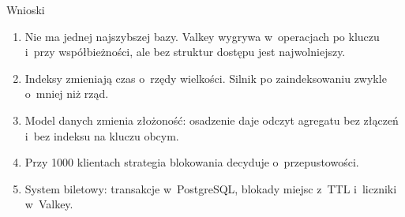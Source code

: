 \documentclass[aspectratio=169,11pt]{beamer}
\begin{document}
\begin{frame}{Wnioski}
  \begin{enumerate}\small
    \item Nie ma jednej najszybszej bazy. Valkey wygrywa w~operacjach po kluczu
      i~przy współbieżności, ale bez struktur dostępu jest najwolniejszy.
    \item Indeksy zmieniają czas o~rzędy wielkości. Silnik po zaindeksowaniu
      zwykle o~mniej niż rząd.
    \item Model danych zmienia złożoność: osadzenie daje odczyt agregatu bez
      złączeń i~bez indeksu na kluczu obcym.
    \item Przy 1000 klientach strategia blokowania decyduje o~przepustowości.
    \item System biletowy: transakcje w~PostgreSQL, blokady miejsc z~TTL
      i~liczniki w~Valkey.
  \end{enumerate}
\end{frame}
\end{document}
